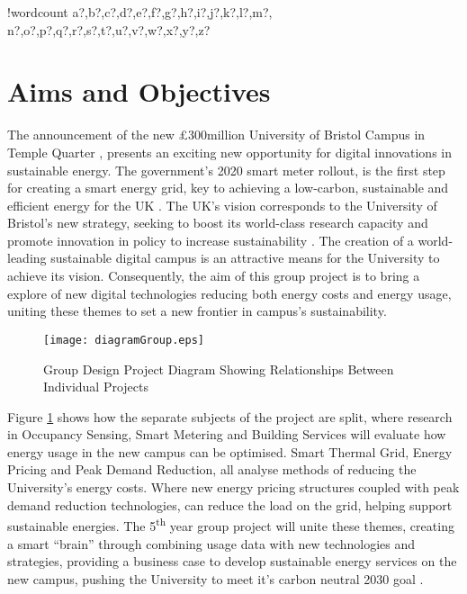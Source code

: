 \documentclass[fontsize=9.5pt]{extarticle}
\numberwithin{figure}{section} %
\newcounter{words}
\newenvironment{counted}{%
  \setcounter{words}{0}
  \SearchList!{wordcount}{\stepcounter{words}}
    {a?,b?,c?,d?,e?,f?,g?,h?,i?,j?,k?,l?,m?,
    n?,o?,p?,q?,r?,s?,t?,u?,v?,w?,x?,y?,z?}
  \UndoBoundary{'}
  \SearchOrder{p;}}{%
  \StopSearching}
\begin{document}
\clearpage
\cfoot{\thepage}
\begin{counted} %
\section{Aims and Objectives}\label{aims-and-objectives}

The announcement of the new £300million University of Bristol Campus in
Temple Quarter \cite{November58:online}, presents an exciting new
opportunity for digital innovations in sustainable energy. The
government's 2020 smart meter rollout, is the first step for creating a
smart energy grid, key to achieving a low-carbon, sustainable and
efficient energy for the UK \cite{SmartEne79:online}. The UK's vision
corresponds to the University of Bristol's new strategy, seeking to
boost its world-class research capacity and promote innovation in policy
to increase sustainability \cite{universi93:online}. The creation of a
world-leading sustainable digital campus is an attractive means for the
University to achieve its vision. Consequently, the aim of this group
project is to bring a explore of new digital technologies reducing both
energy costs and energy usage, uniting these themes to set a new
frontier in campus's sustainability.

\begin{figure}[H]
\centering
\texttt{[image: diagramGroup.eps]}
\caption{Group Design Project Diagram Showing Relationships Between Individual Projects}
\vspace{-20pt}
\label{groupDia}
\end{figure}

Figure \ref{groupDia} shows how the separate subjects of the project are
split, where research in Occupancy Sensing, Smart Metering and Building
Services will evaluate how energy usage in the new campus can be
optimised. Smart Thermal Grid, Energy Pricing and Peak Demand Reduction,
all analyse methods of reducing the University's energy costs. Where new
energy pricing structures coupled with peak demand reduction
technologies, can reduce the load on the grid, helping support
sustainable energies. The 5\textsuperscript{th} year group project will
unite these themes, creating a smart ``brain'' through combining usage
data with new technologies and strategies, providing a business case to
develop sustainable energy services on the new campus, pushing the
University to meet it's carbon neutral 2030 goal
\cite{universi93:online}.


\end{counted}
\end{document}
